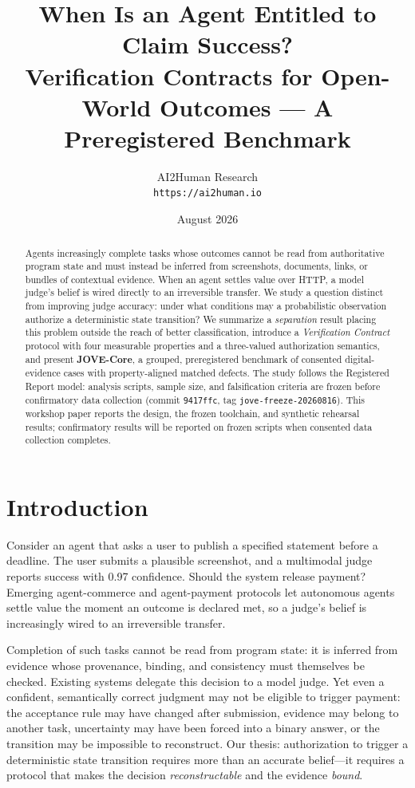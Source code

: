 \documentclass[11pt]{article}
\title{When Is an Agent Entitled to Claim Success?\\\large Verification Contracts for Open-World Outcomes --- A Preregistered Benchmark}
\author{AI2Human Research \\ \texttt{https://ai2human.io}}
\date{August 2026}
\begin{document}
\maketitle

\begin{abstract}
Agents increasingly complete tasks whose outcomes cannot be read from authoritative program state and must instead be inferred from screenshots, documents, links, or bundles of contextual evidence. When an agent settles value over HTTP, a model judge's belief is wired directly to an irreversible transfer. We study a question distinct from improving judge accuracy: under what conditions may a probabilistic observation authorize a deterministic state transition? We summarize a \emph{separation} result placing this problem outside the reach of better classification, introduce a \emph{Verification Contract} protocol with four measurable properties and a three-valued authorization semantics, and present \textbf{JOVE-Core}, a grouped, preregistered benchmark of consented digital-evidence cases with property-aligned matched defects. The study follows the Registered Report model: analysis scripts, sample size, and falsification criteria are frozen before confirmatory data collection (commit \texttt{9417ffc}, tag \texttt{jove-freeze-20260816}). This workshop paper reports the design, the frozen toolchain, and synthetic rehearsal results; confirmatory results will be reported on frozen scripts when consented data collection completes.
\end{abstract}

\section{Introduction}
Consider an agent that asks a user to publish a specified statement before a deadline. The user submits a plausible screenshot, and a multimodal judge reports success with 0.97 confidence. Should the system release payment? Emerging agent-commerce and agent-payment protocols \cite{coinbase2025x402,anthropic2024mcp} let autonomous agents settle value the moment an outcome is declared met, so a judge's belief is increasingly wired to an irreversible transfer.

Completion of such tasks cannot be read from program state: it is inferred from evidence whose provenance, binding, and consistency must themselves be checked. Existing systems delegate this decision to a model judge. Yet even a confident, semantically correct judgment may not be eligible to trigger payment: the acceptance rule may have changed after submission, evidence may belong to another task, uncertainty may have been forced into a binary answer, or the transition may be impossible to reconstruct. Our thesis: authorization to trigger a deterministic state transition requires more than an accurate belief---it requires a protocol that makes the decision \emph{reconstructable} and the evidence \emph{bound}.
\end{document}
